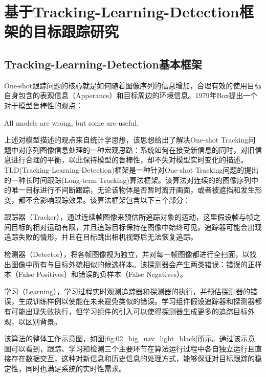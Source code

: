 

\section{基于Tracking-Learning-Detection框架的目标跟踪研究}
\subsection{Tracking-Learning-Detection基本框架}
One-shot跟踪问题的核心就是如何随着图像序列的信息增加，合理有效的使用目标自身包含的表观信息（Apperance）和目标周边的环境信息。1979年Box提出一个对于模型鲁棒性的观点\cite{box1979robustness}：

\begin{center}
All models are wrong, but some are useful.
\end{center} 



上述对模型描述的观点来自统计学思想，该思想给出了解决One-shot Tracking问题中对序列图像信息处理的一种宏观思路：系统如何在接受新信息的同时，对旧信息进行合理的平衡，以此保持模型的鲁棒性，却不失对模型实时变化的描述。TLD(Tracking-Learning-Detection)\cite{kalal2012tracking}框架是一种针对One-shot Tracking问题的提出的一种长时间跟踪(Long-term Tracking)算法框架。该算法对连续的的图像序列中的唯一目标进行不间断跟踪，无论该物体是否暂时离开画面，或者被遮挡和发生形变，都不会影响跟踪效果。该算法框架包含以下三个部分：
\begin{compactenum}
	\item 跟踪器（Tracker），通过连续帧图像来预估所追踪对象的运动，这里假设帧与帧之间目标的相对运动有限，并且追踪目标保持在图像中始终可见。追踪器可能会出现追踪失败的情形，并且在目标跳出相机视野后无法恢复追踪。
	\item 检测器（Detector），将各帧图像视为独立，并对每一帧图像都进行全扫面，以找出图像中所有与目标外貌相似的候选样本。该探测器会产生两类错误：错误的正样本（False Positives）和错误的负样本（False Negatives）。
	\item 学习（Learning），学习过程实时观测追踪器和探测器的执行，并预估探测器的错误，生成训练样例以使能在未来避免类似的错误。学习组件假设追踪器和探测器都有可能出现失败执行，但学习组件的引入可以使得探测器生成更多的追踪目标外观，以区别背景。
\end{compactenum}

该算法的整体工作示意图，如图\ref{fig:02_big_uav_light_black}所示\cite{kalal2012tracking}。通过该示意图可以看到，跟踪、学习和检测三个主要环节在算法运行过程中各自独立运行且直接存在数据交互，这种对新信息和历史信息的处理方式，能够保证对目标跟踪的稳定性，同时也满足系统的实时性需求。

